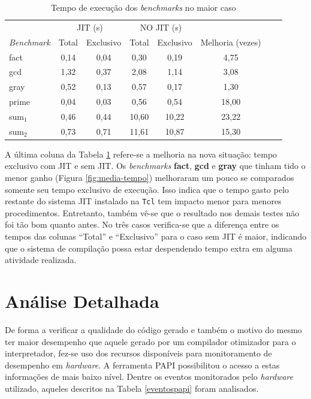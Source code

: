\begin{table}[ht!]
  \caption{Tempo de execução dos \textit{benchmarks} no maior caso\label{tabela-execacc}}
  \centering
  \begin{tabular}{l c c c c c c r}
    \toprule
& \multicolumn{2}{c}{JIT (s)} & \multicolumn{2}{c}{NO JIT (s)} \\
\cmidrule(r){2-3} \cmidrule(r){4-5}
    \textit{Benchmark}  & Total & Exclusivo & Total & Exclusivo & Melhoria (vezes) \\
    \midrule
    fact & 0,14 & 0,04  & 0,30 & 0,19  & 4,75    \\
    gcd & 1,32 & 0,37  & 2,08 & 1,14  & 3,08   \\
    gray & 0,52 & 0,13  & 0,57 & 0,17   & 1,30   \\
    prime & 0,04 & 0,03 & 0,56 & 0,54   & 18,00     \\
    sum$_1$ & 0,46 & 0,44 & 10,60 & 10,22   & 23,22    \\
    sum$_2$ & 0,73 & 0,71 & 11,61 & 10,87   & 15,30     \\
    \bottomrule
  \end{tabular}
\end{table}

A última coluna da Tabela \ref{tabela-execacc} refere-se a melhoria na
nova situação: tempo exclusivo com JIT e sem JIT. Os
\textit{benchmarks} \textbf{fact}, \textbf{gcd} e \textbf{gray} que
tinham tido o menor ganho (Figura \ref{fig:media-tempo}) melhoraram um
pouco se comparados somente seu tempo exclusivo de execução. Isso
indica que o tempo gasto pelo restante do sistema JIT instalado na
\texttt{Tcl} tem impacto menor para menores procedimentos. Entretanto,
também vê-se que o resultado nos demais testes não
foi tão bom quanto antes. No três casos verifica-se que a diferença
entre os tempos das colunas ``Total'' e ``Exclusivo'' para o caso sem
JIT é maior, indicando que o sistema de compilação possa estar
despendendo tempo extra em alguma atividade realizada.


\section{Análise Detalhada}

De forma a verificar a qualidade do código gerado e também o motivo
do mesmo ter maior desempenho que aquele gerado por um compilador
otimizador para o interpretador, fez-se uso dos recursos disponíveis
para monitoramento de desempenho em \textit{hardware}. A ferramenta
PAPI possibilitou o acesso a estas informações de mais baixo
nível. Dentre os eventos monitorados pelo \textit{hardware} utilizado,
aqueles descritos na Tabela \ref{eventospapi} foram analisados.

